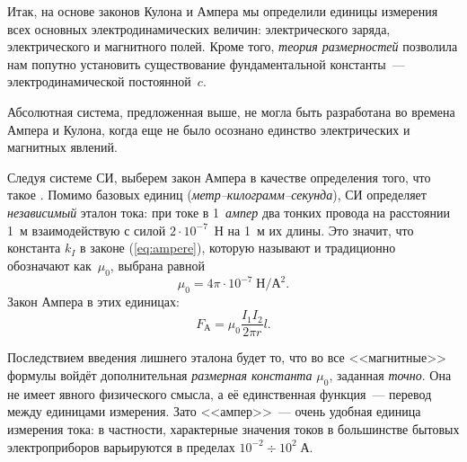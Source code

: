 Итак, на основе законов Кулона и Ампера мы определили единицы измерения
всех основных электродинамических величин: электрического заряда,
электрического и магнитного полей. Кроме того, \emph{теория размерностей}
позволила нам попутно установить существование фундаментальной константы~---
электродинамической постоянной~$c$.


Абсолютная система, предложенная выше, не могла быть разработана во
времена Ампера и Кулона, когда еще не было осознано единство электрических
и магнитных явлений.

Следуя системе СИ, выберем закон Ампера в качестве определения того,
что такое . Помимо базовых единиц (\emph{метр--килограмм--секунда}),
СИ определяет \emph{независимый} эталон тока: при токе в 1~\emph{ампер} два
тонких провода на расстоянии 1~м взаимодействую с силой $2\cdot10^{-7}$~Н
на 1~м их длины. Это значит, что константа $k_{I}$ в законе (\ref{eq:ampere}),
которую называют  и традиционно обозначают
как~$\mu_{0}$, выбрана равной
\[
\mu_{0}=4\pi\cdot10^{-7}\;\text{Н}/\text{А}^{2}.
\]
Закон Ампера в этих единицах:
\begin{equation}
F_{\text{А}}=\mu_{0}\frac{I_{1}I_{2}}{2\pi r}l.
\end{equation}

Последствием введения лишнего эталона будет то, что во все <<магнитные>> формулы
войдёт дополнительная \emph{размерная константа} $\mu_0$, заданная \emph{точно}.
Она не имеет явного физического смысла, а её единственная функция~---
перевод между единицами измерения. Зато <<ампер>>~--- очень удобная
единица измерения тока: в частности, характерные значения токов в
большинстве бытовых электроприборов варьируются в пределах $10^{-2}\div10^2\;\text{А}$.

